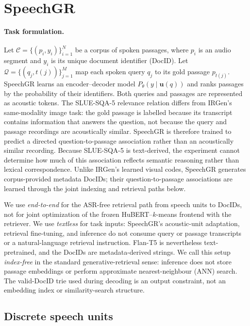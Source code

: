 \section{SpeechGR}
\label{sec:method}

\paragraph{Task formulation.}
Let \(\mathcal{C}=\{(p_i,y_i)\}_{i=1}^{N}\) be a corpus of spoken
passages, where \(p_i\) is an audio segment and \(y_i\) is its unique
document identifier (DocID). Let
\(\mathcal{Q}=\{(q_j,t(j))\}_{j=1}^{M}\) map each spoken query \(q_j\) to its
gold passage \(p_{t(j)}\). SpeechGR learns an encoder--decoder model
\(P_\theta(y\mid \mathbf{u}(q))\) and ranks passages by the probability of their
identifiers. Both queries and passages are represented as acoustic tokens.
The SLUE-SQA-5 relevance relation differs from IRGen's same-modality image
task: the gold passage is labelled because its transcript contains information
that answers the question, not because the query and passage recordings are
acoustically similar. SpeechGR is therefore trained to predict a directed
question-to-passage association rather than an acoustically similar recording.
Because SLUE-SQA-5 is text-derived, the experiment cannot determine how much
of this association reflects semantic reasoning rather than lexical
correspondence. Unlike IRGen's learned visual codes, SpeechGR generates
corpus-provided metadata DocIDs; their question-to-passage associations are
learned through the joint indexing and retrieval paths below.

We use \emph{end-to-end} for the ASR-free retrieval path from speech units to
DocIDs, not for joint optimization of the frozen HuBERT--\(k\)-means frontend
with the retriever. We use \emph{textless} for task inputs: SpeechGR's
acoustic-unit adaptation, retrieval fine-tuning, and inference do not consume
query or passage transcripts or a natural-language retrieval instruction.
Flan-T5 is nevertheless text-pretrained, and the DocIDs are metadata-derived
strings. We call this setup
\emph{index-free} in the standard generative-retrieval sense: inference does
not store passage embeddings or perform approximate nearest-neighbour (ANN)
search.  The valid-DocID trie used during decoding is an output constraint,
not an embedding index or similarity-search structure.



\subsection{Discrete speech units}
\label{sec:units}

